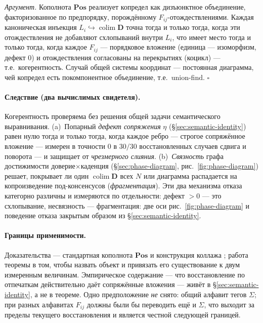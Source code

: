 \documentclass{article}
\begin{document}
\emph{Аргумент.} Кополнота $\mathbf{Pos}$ реализует копредел как дизъюнктное
объединение, факторизованное по предпорядку, порождённому
$F_{ij}$-отождествлениями. Каждая каноническая инъекция
$L_i\hookrightarrow\operatorname{colim}\mathbf{D}$ точна тогда и только тогда,
когда эти отождествления не добавляют схлопываний внутри $L_i$, что имеет
место тогда и только тогда, когда каждое $F_{ij}$ --- порядковое вложение
(единица --- изоморфизм, дефект $0$) и отождествления согласованы на
перекрытиях (коцикл) --- т.е.\ когерентность. Случай общей системы координат
--- постоянная диаграмма, чей копредел есть покомпонентное объединение, т.е.\
union-find. \hfill$\square$

\paragraph{Следствие (два вычислимых свидетеля).} Когерентность проверяема без
решения общей задачи семантического выравнивания. (a)~Попарный \emph{дефект
сопряжения} $\eta$ (\S\ref{sec:semantic-identity}) равен нулю тогда и только
тогда, когда каждое ребро --- строгое сопряжённое вложение --- измерен в
точности $0$ в $30/30$ восстановленных случаев сдвига и поворота --- и
защищает от \emph{чрезмерного слияния}. (b)~\emph{Связность} графа
достижимости доверие$\times$каденция (\S\ref{sec:phase-diagram},
рис.~\ref{fig:phase-diagram}) решает, покрывает ли один
$\operatorname{colim}\mathbf{D}$ всех $N$ или диаграмма распадается на
копроизведение под-консенсусов (\emph{фрагментация}). Эти два механизма отказа
категорно различны и измеряются по отдельности: дефект $>0$ --- это
схлопывание, несвязность --- фрагментация: две оси
рис.~\ref{fig:phase-diagram} и поведение отказа закрытым образом из
\S\ref{sec:semantic-identity}.

\paragraph{Границы применимости.} Доказательства --- стандартная кополнота
$\mathbf{Pos}$ и конструкция коллажа \citep{maclane1998categories}; работа
теоремы в том, чтобы назвать объект и привязать его существование к двум
измеренным величинам. Эмпирическое содержание --- что восстановление по
отпечаткам действительно даёт сопряжённые вложения --- живёт в
\S\ref{sec:semantic-identity}, а не в теореме. Одно предположение \emph{не}
снято: общий алфавит тегов $\Sigma$; при разных алфавитах $F_{ij}$ должны были
бы переводить ещё и $\Sigma$, что выходит за пределы текущего восстановления и
является честной следующей границей.
\end{document}
